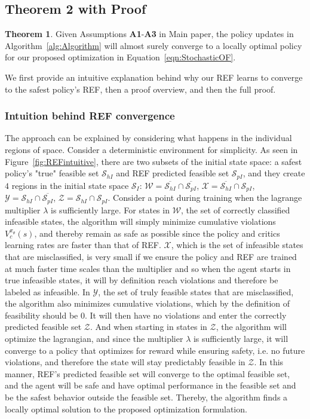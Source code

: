 \documentclass{article}
\theoremstyle{definition}
\newtheorem{theorem}{Theorem}
\begin{document}
\subsection{Theorem 2 with Proof}
\label{sec:ConvergenceThm}

\begin{theorem}
    Given Assumptions \textbf{A1}-\textbf{A3} in Main paper, the policy updates in Algorithm~\ref{alg:Algorithm} 
    will almost surely converge to a locally optimal policy for our proposed optimization in Equation~\ref{eqn:StochasticOF}.  
\end{theorem}

We first provide an intuitive explanation behind why our REF learns to converge to the safest policy's REF, then a proof overview, and then the full proof.

\subsubsection{Intuition behind REF convergence}
The approach can be explained by considering what happens in the individual regions of space. Consider a deterministic environment for simplicity. As seen in Figure~\ref{fig:REFintuitive}, there are two subsets of the initial state space: a safest policy's "true" feasible set $\mathcal{S}_{hI}$ and REF predicted feasible set $\mathcal{S}_{pI}$, and they create $4$ regions in the initial state space $\mathcal{S}_I$: 
$\mathcal{W}=\overline{\mathcal{S}_{hI}}\cap\overline{ \mathcal{S}_{pI}}$, $\mathcal{X}=\overline{\mathcal{S}_{hI}}\cap \mathcal{S}_{pI}$, $\mathcal{Y}=\mathcal{S}_{hI}\cap\overline{ \mathcal{S}_{pI}}$, $\mathcal{Z}=\mathcal{S}_{hI}\cap \mathcal{S}_{pI}$. Consider a point during training when the lagrange multiplier $\lambda$ is sufficiently large. For states in $\mathcal{W}$, the set of correctly classified infeasible states, the algorithm will simply minimize cumulative violations $V^{\pi_\theta}_c(s)$, and thereby remain as safe as possible since the policy and critics learning rates are faster than that of REF. $\mathcal{X}$, which is the set of infeasible states that are misclassified, is very small if we ensure the policy and REF are trained at much faster time scales than the multiplier and so when the agent starts in true infeasible states, it will by definition reach violations and therefore be labeled as infeasible. In $\mathcal{Y}$, the set of truly feasible states that are misclassified, the algorithm also minimizes cumulative violations, which by the definition of feasibility should be $0$. It will then have no violations and enter the correctly predicted feasible set $\mathcal{Z}$. And when starting in states in $\mathcal{Z}$, the algorithm will optimize the lagrangian, and since the multiplier $\lambda$ is sufficiently large, it will converge to a policy that optimizes for reward while ensuring safety, i.e. no future violations, and therefore the state will stay predictably feasible in $\mathcal{Z}$. In this manner, REF's predicted feasible set will converge to the optimal feasible set, and the agent will be safe and have optimal performance in the feasible set and be the safest behavior outside the feasible set. Thereby, the algorithm finds a locally optimal solution to the proposed optimization formulation.
\end{document}
